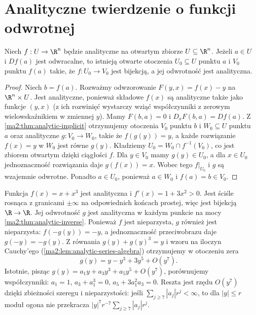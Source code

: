\section{Analityczne twierdzenie o funkcji odwrotnej}

\begin{twierdzenie}
\label{ma2:thm:analytic-inverse}
Niech $f:U\to\R^n$ będzie analityczne
na otwartym zbiorze $U\subseteq\R^n$.
Jeżeli $a\in U$ i $Df(a)$ jest odwracalne,
to istnieją otwarte otoczenia $U_0\subseteq U$
punktu $a$ i $V_0$ punktu $f(a)$ takie,
że $f:U_0\to V_0$ jest bijekcją, a jej
odwrotność jest analityczna.
\end{twierdzenie}
\begin{proof}
Niech $b=f(a)$. Rozważmy odwzorowanie
$F(y,x)=f(x)-y$ na $\R^n\times U$.
Jest analityczne, ponieważ składowe $f(x)$
są analityczne także jako funkcje $(y,x)$
(z ich rozwinięć wystarczy wziąć współczynniki
z zerowym wielowskaźnikiem w zmiennej $y$).
Mamy $F(b,a)=0$ i $D_xF(b,a)=Df(a)$.
Z \ref{ma2:thm:analytic-implicit} otrzymujemy
otoczenia $V_0$ punktu $b$ i $W_0\subseteq U$
punktu $a$ oraz analityczne $g:V_0\to W_0$,
takie że $f(g(y))=y$, a każde rozwiązanie
$f(x)=y$ w $W_0$ jest równe $g(y)$.
Kładziemy $U_0=W_0\cap f^{-1}(V_0)$,
co jest zbiorem otwartym dzięki ciągłości $f$.
Dla $y\in V_0$ mamy $g(y)\in U_0$,
a dla $x\in U_0$ jednoznaczność rozwiązania
daje $g(f(x))=x$.
Wobec tego $f|_{U_0}$ i $g$ są wzajemnie
odwrotne. Ponadto $a\in U_0$, ponieważ
$a\in W_0$ i $f(a)=b\in V_0$.
\end{proof}

\begin{przyklad}
\label{ma2:ex:analytic-inverse-cubic}
Funkcja $f(x)=x+x^3$ jest analityczna
i $f'(x)=1+3x^2>0$. Jest ściśle rosnąca
z granicami $\pm\infty$ na odpowiednich
końcach prostej, więc jest bijekcją $\R\to\R$.
Jej odwrotność $g$ jest analityczna w każdym
punkcie na mocy \ref{ma2:thm:analytic-inverse}.
Ponieważ $f$ jest nieparzysta, $g$ również
jest nieparzysta: $f(-g(y))=-y$,
a jednoznaczność przeciwobrazu daje
$g(-y)=-g(y)$.
Z równania $g(y)+g(y)^3=y$ i wzoru na
iloczyn Cauchy'ego (\ref{ma2:lem:analytic-series-algebra})
otrzymujemy
w otoczeniu zera
\[
 g(y)=y-y^3+3y^5+O(y^7).
\]
Istotnie, pisząc $g(y)=a_1y+a_3y^3+a_5y^5
+O(y^7)$, porównujemy współczynniki:
$a_1=1$, $a_3+a_1^3=0$,
$a_5+3a_1^2a_3=0$.
Reszta jest rzędu $O(y^7)$ dzięki
zbieżności szeregu i nieparzystości:
jeśli $\sum_{j\ge7}|a_j|r^j<\infty$, to dla
$|y|\le r$ moduł ogona nie przekracza
$|y|^7r^{-7}\sum_{j\ge7}|a_j|r^j$.
\end{przyklad}

